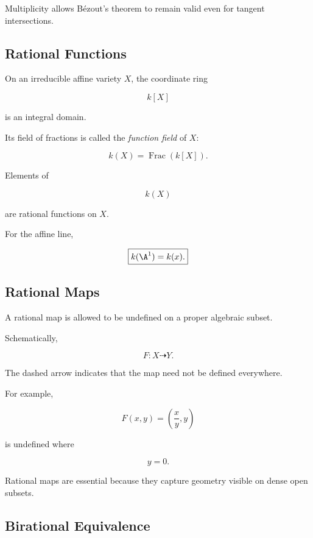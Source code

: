 Multiplicity allows B\'ezout's theorem to remain valid even for tangent
intersections.

\subsection{Rational Functions}
\label{subsec:algebraic-rational-functions}

On an irreducible affine variety \(X\), the coordinate ring

\[
k[X]
\]

is an integral domain.

Its field of fractions is called the \emph{function field} of \(X\):

\[
\boxed{
k(X)=\operatorname{Frac}(k[X]).
}
\]

Elements of

\[
k(X)
\]

are rational functions on \(X\).

For the affine line,

\[
\boxed{
k(\A^1)=k(x).
}
\]

\subsection{Rational Maps}
\label{subsec:rational-maps}

A rational map is allowed to be undefined on a proper algebraic subset.

Schematically,

\[
\boxed{
F:X\dashrightarrow Y.
}
\]

The dashed arrow indicates that the map need not be defined everywhere.

For example,

\[
\boxed{
F(x,y)=\left(\frac{x}{y},y\right)
}
\]

is undefined where

\[
y=0.
\]

Rational maps are essential because they capture geometry visible on dense
open subsets.

\subsection{Birational Equivalence}
\label{subsec:birational-equivalence}

